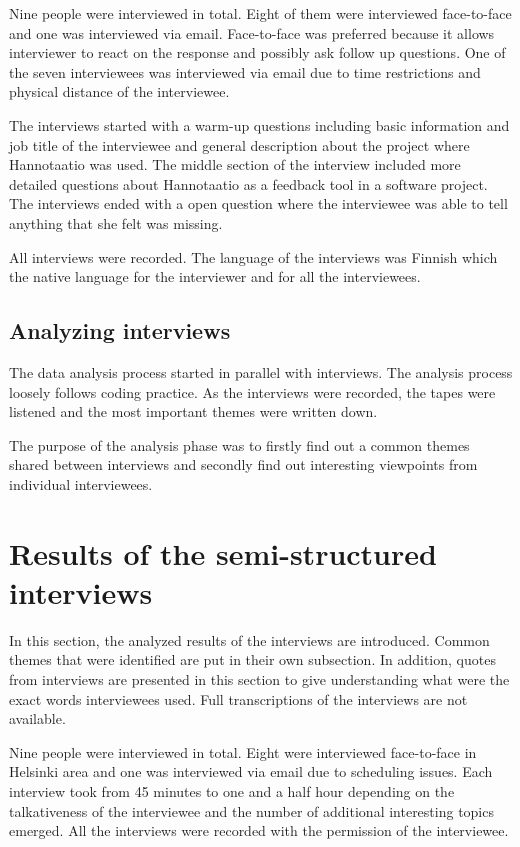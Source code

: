 \documentclass[english,12pt,a4paper,pdftex]{article}
\begin{document}
Nine people were interviewed in total. Eight of them were interviewed face-to-face and one was interviewed via email. Face-to-face was preferred because it allows interviewer to react on the response and possibly ask follow up questions. One of the seven interviewees was interviewed via email due to time restrictions and physical distance of the interviewee.

The interviews started with a warm-up questions including basic information and job title of the interviewee and general description about the project where Hannotaatio was used. The middle section of the interview included more detailed questions about Hannotaatio as a feedback tool in a software project. The interviews ended with a open question where the interviewee was able to tell anything that she felt was missing.

All interviews were recorded. The language of the interviews was Finnish which the native language for the interviewer and for all the interviewees.

\subsection{Analyzing interviews}

The data analysis process started in parallel with interviews. The analysis process loosely follows coding practice. As the interviews were recorded, the tapes were listened and the most important themes were written down. 

The purpose of the analysis phase was to firstly find out a common themes shared between interviews and secondly find out interesting viewpoints from individual interviewees.

\clearpage

\section{Results of the semi-structured interviews}
\label{sec:results}
\acresetall

In this section, the analyzed results of the interviews are introduced. Common themes that were identified are put in their own subsection. In addition, quotes from interviews are presented in this section to give understanding what were the exact words interviewees used. Full transcriptions of the interviews are not available.

Nine people were interviewed in total. Eight were interviewed face-to-face in Helsinki area and one was interviewed  via email due to scheduling issues. Each interview took from 45 minutes to one and a half hour depending on the talkativeness of the interviewee and the number of additional interesting topics emerged. All the interviews were recorded with the permission of the interviewee. 
\end{document}
